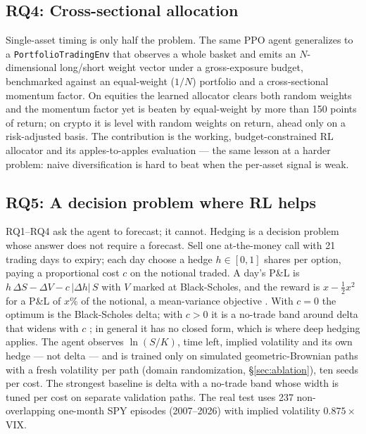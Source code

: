 \documentclass[10pt,twocolumn]{article}
\newcommand{\pc}{\%}  %
\begin{document}
\subsection{RQ4: Cross-sectional allocation}
Single-asset timing is only half the problem. The same PPO agent generalizes to a
\texttt{PortfolioTradingEnv} that observes a whole basket and emits an
$N$-dimensional long/short weight vector under a gross-exposure budget, benchmarked
against an equal-weight ($1/N$) portfolio and a cross-sectional momentum factor. On
equities the learned allocator clears both random weights and the momentum factor
yet is beaten by equal-weight by more than 150 points of return; on crypto it is
level with random weights on return, ahead only on a risk-adjusted basis. The
contribution is the working, budget-constrained RL allocator and its
apples-to-apples evaluation --- the same lesson at a harder problem: naive
diversification is hard to beat when the per-asset signal is weak.

\subsection{RQ5: A decision problem where RL helps}\label{sec:hedge}
RQ1--RQ4 ask the agent to forecast; it cannot. Hedging is a decision problem whose
answer does not require a forecast. Sell one at-the-money call with 21 trading days
to expiry; each day choose a hedge $h\in[0,1]$ shares per option, paying a
proportional cost $c$ on the notional traded. A day's P\&L is
$h\,\Delta S-\Delta V-c\,|\Delta h|\,S$ with $V$ marked at Black-Scholes, and the
reward is $x-\tfrac12x^2$ for a P\&L of $x\pc$ of the notional, a mean-variance
objective \cite{kolm2019}. With $c=0$ the optimum is the Black-Scholes delta; with
$c>0$ it is a no-trade band around delta that widens with $c$ \cite{whalley1997}; in
general it has no closed form, which is where deep hedging \cite{buehler2019}
applies. The agent observes $\ln(S/K)$, time left, implied volatility and its own
hedge --- not delta --- and is trained only on simulated geometric-Brownian paths with
a fresh volatility per path (domain randomization, \S\ref{sec:ablation}), ten seeds
per cost. The strongest baseline is delta with a no-trade band whose width is tuned
per cost on separate validation paths. The real test uses 237 non-overlapping
one-month SPY episodes (2007--2026) with implied volatility $0.875\times$VIX.
\end{document}

